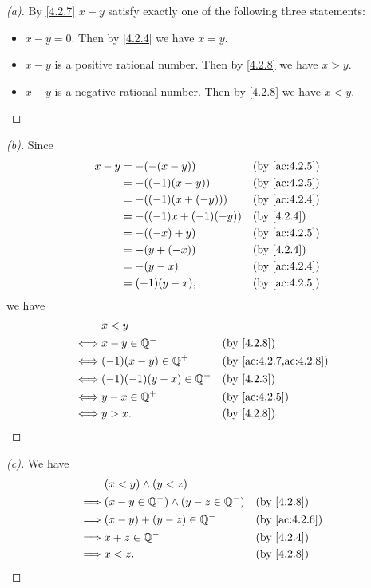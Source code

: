 \begin{proof}[(a)]
  By \cref{4.2.7} \(x - y\) satisfy exactly one of the following three statements:
  \begin{itemize}
    \item \(x - y = 0\).
          Then by \cref{4.2.4} we have \(x = y\).
    \item \(x - y\) is a positive rational number.
          Then by \cref{4.2.8} we have \(x > y\).
    \item \(x - y\) is a negative rational number.
          Then by \cref{4.2.8} we have \(x < y\).
  \end{itemize}
\end{proof}

\begin{proof}[(b)]
  Since
  \begin{align*}
    x - y & = -(-(x - y))           &  & \by{ac:4.2.5} \\
          & = -((-1) (x - y))       &  & \by{ac:4.2.5} \\
          & = -((-1) (x + (-y)))    &  & \by{ac:4.2.4} \\
          & = -((-1) x + (-1) (-y)) &  & \by{4.2.4}    \\
          & = -((-x) + y)           &  & \by{ac:4.2.5} \\
          & = -(y + (-x))           &  & \by{4.2.4}    \\
          & = -(y - x)              &  & \by{ac:4.2.4} \\
          & = (-1)(y - x),          &  & \by{ac:4.2.5}
  \end{align*}
  we have
  \begin{align*}
         & x < y                                                \\
    \iff & x - y \in \Q^-           &  & \by{4.2.8}             \\
    \iff & (-1)(x - y) \in \Q^+     &  & \by{ac:4.2.7,ac:4.2.8} \\
    \iff & (-1)(-1)(y - x) \in \Q^+ &  & \by{4.2.3}             \\
    \iff & y - x \in \Q^+           &  & \by{ac:4.2.5}          \\
    \iff & y > x.                   &  & \by{4.2.8}
  \end{align*}
\end{proof}

\begin{proof}[(c)]
  We have
  \begin{align*}
             & (x < y) \land (y < z)                                      \\
    \implies & (x - y \in \Q^-) \land (y - z \in \Q^-) &  & \by{4.2.8}    \\
    \implies & (x - y) + (y - z) \in \Q^-              &  & \by{ac:4.2.6} \\
    \implies & x + z \in \Q^-                          &  & \by{4.2.4}    \\
    \implies & x < z.                                  &  & \by{4.2.8}
  \end{align*}
\end{proof}

